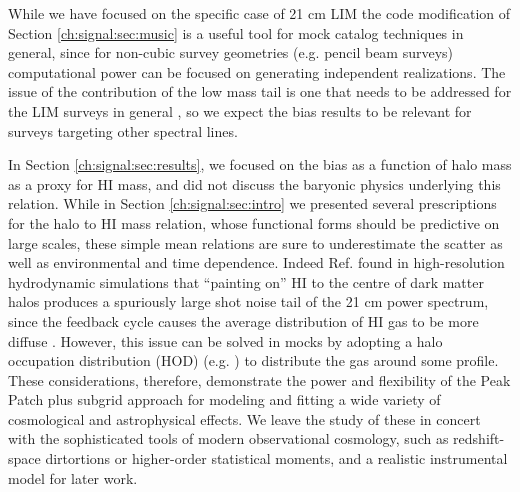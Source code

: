 While we have focused on the specific case of 21 cm LIM the code modification of Section \ref{ch:signal:sec:music} is a useful tool for mock catalog techniques in general, since for non-cubic survey geometries (e.g. pencil beam surveys) computational power can be focused on generating independent realizations. The issue of the contribution of the low mass tail is one that needs to be addressed for the LIM surveys in general \citep{statusreport}, so we expect the bias results to be relevant for surveys targeting other spectral lines.

In Section \ref{ch:signal:sec:results}, we focused on the bias as a function of halo mass as a proxy for HI mass, and did not discuss the baryonic physics underlying this relation. While in Section \ref{ch:signal:sec:intro} we presented several prescriptions for the halo to HI mass relation, whose functional forms should be predictive on large scales, these simple mean relations are sure to underestimate the scatter as well as environmental and time dependence. Indeed Ref. \cite{illustristng21cm} found in high-resolution hydrodynamic simulations that ``painting on'' HI to the centre of dark matter halos produces a spuriously large shot noise tail of the 21 cm power spectrum, since the feedback cycle causes the average distribution of HI gas to be more diffuse \citep{firehi}. However, this issue can be solved in mocks by adopting a halo occupation distribution (HOD) (e.g. \citep{maneraetal2013}) to distribute the gas around some profile. These considerations, therefore, demonstrate the power and flexibility of the Peak Patch plus subgrid approach for modeling and fitting a wide variety of cosmological and astrophysical effects. We leave the study of these in concert with the sophisticated tools of modern observational cosmology, such as redshift-space dirtortions or higher-order statistical moments, and a realistic instrumental model for later work.